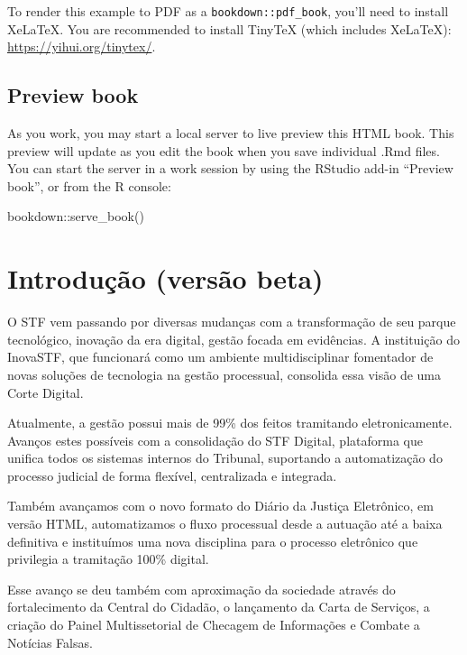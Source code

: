 \documentclass[
]{book}
\newenvironment{Shaded}{\begin{snugshade}}{\end{snugshade}}
\newcommand{\FunctionTok}[1]{\textcolor[rgb]{0.00,0.00,0.00}{#1}}
\newcommand{\NormalTok}[1]{#1}
\newcommand{\SpecialCharTok}[1]{\textcolor[rgb]{0.00,0.00,0.00}{#1}}
\begin{document}
To render this example to PDF as a \texttt{bookdown::pdf\_book}, you'll need to install XeLaTeX. You are recommended to install TinyTeX (which includes XeLaTeX): \url{https://yihui.org/tinytex/}.

\hypertarget{preview-book}{%
\section{Preview book}\label{preview-book}}

As you work, you may start a local server to live preview this HTML book. This preview will update as you edit the book when you save individual .Rmd files. You can start the server in a work session by using the RStudio add-in ``Preview book'', or from the R console:

\begin{Shaded}
\begin{Highlighting}[]
\NormalTok{bookdown}\SpecialCharTok{::}\FunctionTok{serve\_book}\NormalTok{()}
\end{Highlighting}
\end{Shaded}

\hypertarget{introduuxe7uxe3o-versuxe3o-beta}{%
\chapter{Introdução (versão beta)}\label{introduuxe7uxe3o-versuxe3o-beta}}

O STF vem passando por diversas mudanças com a transformação de seu parque tecnológico, inovação da era digital, gestão focada em evidências. A instituição do InovaSTF, que funcionará como um ambiente multidisciplinar fomentador de novas soluções de tecnologia na gestão processual, consolida essa visão de uma Corte Digital.

Atualmente, a gestão possui mais de 99\% dos feitos tramitando eletronicamente. Avanços estes possíveis com a consolidação do STF Digital, plataforma que unifica todos os sistemas internos do Tribunal, suportando a automatização do processo judicial de forma flexível, centralizada e integrada.

Também avançamos com o novo formato do Diário da Justiça Eletrônico, em versão HTML, automatizamos o fluxo processual desde a autuação até a baixa definitiva e instituímos uma nova disciplina para o processo eletrônico que privilegia a tramitação 100\% digital.

Esse avanço se deu também com aproximação da sociedade através do fortalecimento da Central do Cidadão, o lançamento da Carta de Serviços, a criação do Painel Multissetorial de Checagem de Informações e Combate a Notícias Falsas.
\end{document}
